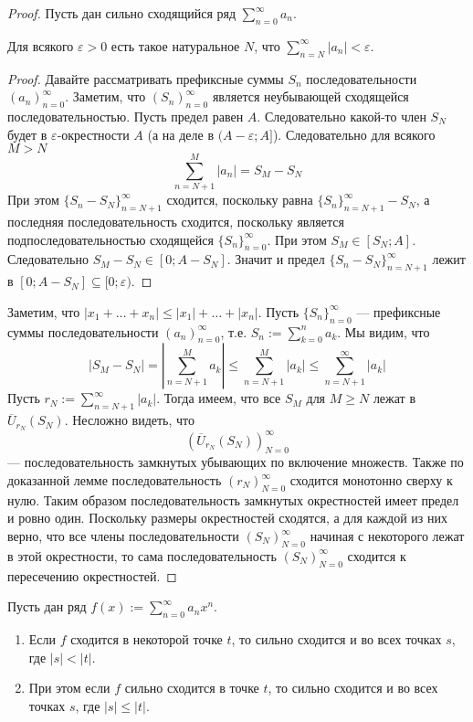\documentclass[12pt,a4paper]{article}
\begin{document}
    \begin{proof}
        Пусть дан сильно сходящийся ряд $\sum_{n=0}^\infty a_n$.

        \begin{thlemma}
            Для всякого $\varepsilon > 0$ есть такое натуральное $N$, что $\sum_{n=N}^\infty |a_n| < \varepsilon$.
        \end{thlemma}

        \begin{proof}
            Давайте рассматривать префиксные суммы $S_n$ последовательности $(a_n)_{n=0}^\infty$. Заметим, что $(S_n)_{n=0}^\infty$ является неубывающей сходящейся последовательностью. Пусть предел равен $A$. Следовательно какой-то член $S_N$ будет в $\varepsilon$-окрестности $A$ (а на деле в $(A - \varepsilon; A]$). Следовательно для всякого $M > N$
            \[\sum_{n=N+1}^M |a_n| = S_M - S_N\]
            При этом $\{S_n - S_N\}_{n=N+1}^\infty$ сходится, поскольку равна $\{S_n\}_{n=N+1}^\infty - S_N$, а последняя последовательность сходится, поскольку является подпоследовательностью сходящейся $\{S_n\}_{n=0}^\infty$. При этом $S_M \in [S_N; A]$. Следовательно $S_M - S_N \in [0; A - S_N]$. Значит и предел $\{S_n - S_N\}_{n=N+1}^\infty$ лежит в $[0; A - S_N] \subseteq [0; \varepsilon)$.
        \end{proof}

        Заметим, что $|x_1 + \dots + x_n| \leqslant |x_1| + \dots + |x_n|$. Пусть $\{S_n\}_{n=0}^\infty$ --- префиксные суммы последовательности $(a_n)_{n=0}^\infty$, т.е. $S_n := \sum_{k=0}^n a_k$. Мы видим, что
        \[|S_M - S_N| = \left|\sum_{n=N+1}^M a_k\right| \leqslant \sum_{n=N+1}^M |a_k| \leqslant \sum_{n=N+1}^\infty |a_k|\]
        Пусть $r_N := \sum_{n=N+1}^\infty |a_k|$. Тогда имеем, что все $S_M$ для $M \geqslant N$ лежат в $\overline{U}_{r_N}(S_N)$. Несложно видеть, что
        \[\left(\overline{U}_{r_N}(S_N)\right)_{N=0}^\infty\]
        --- последовательность замкнутых убывающих по включение множеств. Также по доказанной лемме последовательность $(r_N)_{N=0}^\infty$ сходится монотонно сверху к нулю. Таким образом последовательность замкнутых окрестностей имеет предел и ровно один. Поскольку размеры окрестностей сходятся, а для каждой из них верно, что все члены последовательности $(S_N)_{N=0}^\infty$ начиная с некоторого лежат в этой окрестности, то сама последовательность $(S_N)_{N=0}^\infty$ сходится к пересечению окрестностей.
    \end{proof}

    \begin{theorem}
        Пусть дан ряд $f(x) := \sum_{n=0}^\infty a_n x^n$.
        \begin{enumerate}
            \item Если $f$ сходится в некоторой точке $t$, то сильно сходится и во всех точках $s$, где $|s| < |t|$.
            \item При этом если $f$ сильно сходится в точке $t$, то сильно сходится и во всех точках $s$, где $|s| \leqslant |t|$.
        \end{enumerate}
    \end{theorem}
\end{document}
